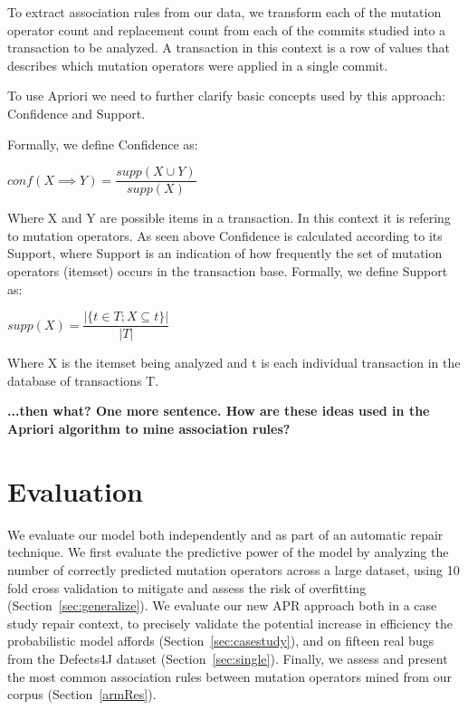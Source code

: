 \documentclass[conference]{IEEEtran}
\newcommand{\todo}[1]
  {{\scriptsize \textbf{\color{red} {#1}}}}
\begin{document}
To extract association rules from  our data, we
transform each of the mutation operator count and replacement count from 
each of the commits studied into a transaction to be analyzed. A transaction 
in this context is a row of values that describes which mutation operators were applied in a single commit.

To use Apriori we need to further clarify basic concepts used by this approach: Confidence and Support.

Formally, we define Confidence as:

\begin{center}
$conf(X \implies Y) = \dfrac{supp(X \cup Y)}{supp(X)}$ 
\end{center}

Where X and Y are possible items in a transaction. In this context it is refering to
 mutation operators. As seen above Confidence is calculated according to its Support, 
 where Support is an indication of how frequently the set of mutation operators (itemset) 
 occurs in the transaction base.
Formally, we define Support as:

\begin{center}
$supp(X) = \dfrac{|\{t \in T; X \subseteq t\}|}{|T|}$
\end{center}

Where X is the itemset being analyzed and t is each individual transaction in the database of transactions T. 

\todo{...then what?  One more sentence.  How are these ideas used in the Apriori
  algorithm to mine association rules?}

\section{Evaluation} \label{evaluation}

We evaluate our model both independently and as part of an automatic repair
technique.  We first evaluate the predictive power of the model by analyzing the
number of correctly predicted mutation operators across a large dataset, using 10 fold cross
validation to mitigate and assess the risk of overfitting
(Section~\ref{sec:generalize}). We evaluate our new APR approach both in a case study 
repair context, to precisely validate the potential increase in efficiency the
probabilistic model affords (Section~\ref{sec:casestudy}), and 
on fifteen real bugs from the Defects4J dataset
(Section~\ref{sec:single}).  Finally, we assess and present the most common 
association rules between mutation operators mined from our corpus
(Section~\ref{armRes}). 
\end{document}
